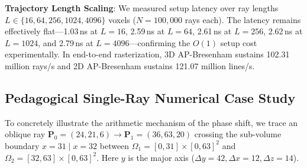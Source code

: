 \documentclass[conference]{IEEEtran}
\begin{document}
\textbf{Trajectory Length Scaling}: We measured setup latency over ray lengths $L \in \{16, 64, 256, 1024, 4096\}$ voxels ($N = 100,000$ rays each). The latency remains effectively flat---1.03\,ns at $L=16$, 2.59\,ns at $L=64$, 2.61\,ns at $L=256$, 2.62\,ns at $L=1024$, and 2.79\,ns at $L=4096$---confirming the $O(1)$ setup cost experimentally. In end-to-end rasterization, 3D AP-Bresenham sustains 102.31 million rays/s and 2D AP-Bresenham sustains 121.07 million lines/s.

\begin{table}[htbp]
\centering
\caption{Native C++ Setup Performance ($N = 2,000,000$ operations)}
\label{tab:setup_latency}
\end{table}

\subsection{Pedagogical Single-Ray Numerical Case Study}
To concretely illustrate the arithmetic mechanism of the phase shift, we trace an oblique ray $\mathbf{P}_0 = (24, 21, 6) \to \mathbf{P}_1 = (36, 63, 20)$ crossing the sub-volume boundary $x = 31 \mid x = 32$ between $\Omega_1 = [0, 31] \times [0, 63]^2$ and $\Omega_2 = [32, 63] \times [0, 63]^2$. Here $y$ is the major axis ($\Delta y = 42, \Delta x = 12, \Delta z = 14$).
\end{document}
